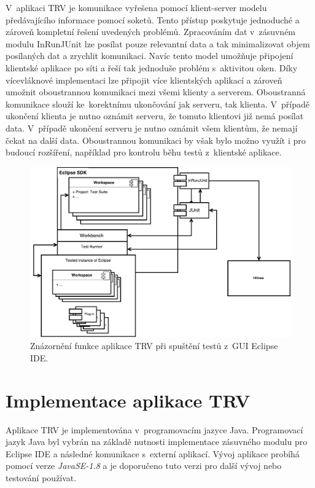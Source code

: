     \noindent
    V~aplikaci TRV je komunikace vyřešena pomocí klient-server modelu předávajícího informace pomocí soketů. Tento přístup poskytuje jednoduché a zároveň kompletní řešení uvedených problémů. Zpracováním dat v~zásuvném modulu InRunJUnit lze posílat pouze relevantní data a tak minimalizovat objem posílaných dat a zrychlit komunikaci. Navíc tento model umožňuje připojení klientské aplikace po síti a řeší tak jednoduše problém s~aktivitou oken. Díky vícevláknové implementaci lze připojit více klientských aplikací a zároveň umožnit oboustrannou komunikaci mezi všemi klienty a serverem. Oboustranná komunikace slouží ke~korektnímu ukončování jak serveru, tak klienta. V~případě ukončení klienta je nutno oznámit serveru, že tomuto klientovi již nemá posílat data. V~případě ukončení serveru je nutno oznámit všem klientům, že nemají čekat na další data. Oboustrannou komunikaci by však bylo možno využít i pro budoucí rozšíření, například pro kontrolu běhu testů z~klientské aplikace.

    \begin{figure}
      \includegraphics[width=\textwidth, center]{obrazky-figures/TRV_run_from_gui.pdf}
      \caption{Znázornění funkce aplikace TRV při spuštění testů z~GUI Eclipse IDE.}
      \label{fig:TRV_run_from_gui}
    \end{figure}


  \section{Implementace aplikace TRV}
  Aplikace TRV je implementována v~programovacím jazyce Java. Programovací jazyk Java byl vybrán na základě nutnosti implementace zásuvného modulu pro Eclipse IDE a následné komunikace s~externí aplikací. Vývoj aplikace probíhá pomocí verze \emph{JavaSE-1.8} a je doporučeno tuto verzi pro další vývoj nebo testování používat.

